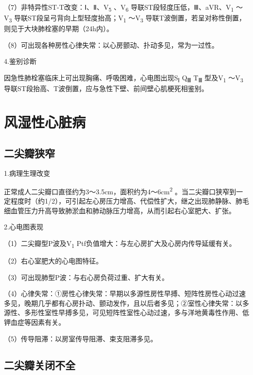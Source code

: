（7）非特异性ST-T改变：Ⅰ、Ⅱ、V\textsubscript{5} 、V\textsubscript{6}
导联ST段轻度压低，Ⅲ、aVR、V\textsubscript{1} ～V\textsubscript{3}
导联ST段呈弓背向上型轻度抬高；V\textsubscript{1} ～V\textsubscript{3}
导联T波倒置，若呈对称性倒置，则见于大块肺栓塞的早期（24h内）。

（8）可出现各种房性心律失常：以心房颤动、扑动多见，常为一过性。

4.鉴别诊断

因急性肺栓塞临床上可出现胸痛、呼吸困难，心电图出现S\textsubscript{Ⅰ}
Q\textsubscript{Ⅲ} T\textsubscript{Ⅲ} 型及V\textsubscript{1}
～V\textsubscript{3}
导联ST段抬高、T波倒置，应与急性下壁、前间壁心肌梗死相鉴别。

\protect\hypertarget{text00050.htmlux5cux23subid599}{}{}

\section{风湿性心脏病}

\protect\hypertarget{text00050.htmlux5cux23subid600}{}{}

\subsection{二尖瓣狭窄}

1.病理生理改变

正常成人二尖瓣口直径约为3～3.5cm，面积约为4～6cm\textsuperscript{2}
。当二尖瓣口狭窄到一定程度时（约1/2），可引起左心房压力增高、代偿性扩大，继之出现肺静脉、肺毛细血管压力升高导致肺淤血和肺动脉压力增高，从而引起右心室肥大、扩张。

2.心电图表现

（1）二尖瓣型P波及V\textsubscript{1}
Ptf负值增大：与左心房扩大及心房内传导延缓有关。

（2）右心室肥大的心电图特征。

（3）可出现肺型P波：与右心房负荷过重、扩大有关。

（4）心律失常：①房性心律失常：早期以多源性房性早搏、短阵性房性心动过速多见，晚期几乎都有心房扑动、颤动发作，且以后者多见；②室性心律失常：以多源性、多形性室性早搏多见，可见短阵性室性心动过速，多与洋地黄毒性作用、低钾血症等因素有关。

（5）传导阻滞：以房室传导阻滞、束支阻滞多见。

\protect\hypertarget{text00050.htmlux5cux23subid601}{}{}

\subsection{二尖瓣关闭不全}

